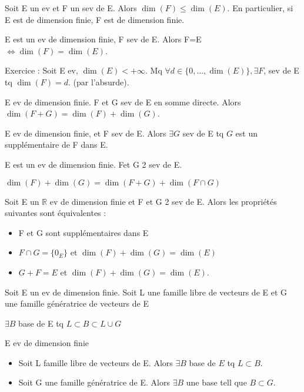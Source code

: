 \documentclass[french]{yLectureNote}
\newcommand{\R}[0]{\mathbb{R}}
\begin{document}


\begin{proposition}
Soit E un ev et F un sev de E. Alors \(\dim(F)\leq \dim(E)\). En particulier, si E est de dimension finie, F est de dimension finie.
\end{proposition}
\begin{proposition}
E est un ev de dimension finie, F sev de E. Alors F=E \(\iff \dim(F) = \dim(E)\).
\end{proposition}
Exercice : Soit E ev, \(\dim(E)<+\infty\). Mq $\forall d\in \{0,\dots, \dim(E)\},\exists F$, sev de E tq $\dim(F)=d$. (par l'absurde).

\begin{proposition}
E ev de dimension finie. F et G sev de E en somme directe. Alors \(\dim(F+G) = \dim(F)+\dim(G)\).
\end{proposition}
\begin{proposition}
E ev de dimension finie, et F sev de E. Alors \(\exists G\) sev de E tq \(G\) est un supplémentaire de F dans E.
\end{proposition}
\begin{proposition}
E est un ev de dimension finie. Fet G 2 sev de E.

\(\dim(F)+\dim(G) = \dim(F+G) + \dim(F\cap G)\)
\end{proposition}
\begin{proposition}
Soit E un \(\R\) ev de dimension finie et F et G 2 sev de E. Alors les propriétés suivantes sont équivalentes :
\begin{itemize}
 \item F et G sont supplémentaires dans E
 \item \(F\cap G = \{0_E\}\) et \(\dim(F)+\dim(G) = \dim(E)\)
 \item \(G+F = E\) et \(\dim(F)+\dim(G) = \dim(E)\).
\end{itemize}
\end{proposition}
\begin{proposition}
Soit E un ev de dimension finie. Soit L une famille libre de vecteurs de E et G une famille génératrice de vecteurs de E

\(\exists B\) base de E tq \(L\subset B\subset L\cup G\)
\end{proposition}
\begin{theorem}
 E ev de dimension finie
 \begin{itemize}
  \item Soit L famille libre de vecteurs de E. Alors \(\exists B\) base de \(E\) tq \(L\subset B\).
  \item Soit G une famille génératrice de E. Alors \(\exists B\) une base tell que \(B\subset G\).
 \end{itemize}
\end{theorem}
\end{document}
